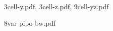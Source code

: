 \begin{figure}[tbh]
\begin{center}
  \caption{3cell-y.pdf, 3cell-z.pdf, 9cell-yz.pdf}\label{fig:cell}
  \end{center}
\end{figure}


\begin{figure}[tbh]
  \begin{center}
    \caption{8var-pipo-bw.pdf}\label{fig:8var-pipo-bw}
  \end{center}
\end{figure}

